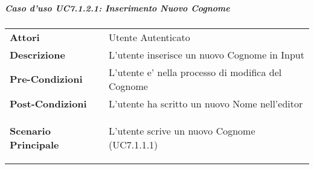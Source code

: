 \subparagraph{Caso d'uso UC7.1.2.1:  Inserimento Nuovo Cognome}
\label{UC7_1_2_1}

\begin{tabular}{ l | p{11cm}}
	\hline
	\rowcolor{Gray}
	 \multicolumn{2}{c}{UC7.1.2.1 - Inserimento Nuovo Cognome} \\
	 \hline
	\textbf{Attori} & Utente Autenticato \\
	\textbf{Descrizione} & L'utente inserisce un nuovo Cognome in Input\\
	\textbf{Pre-Condizioni} & L'utente e' nella processo di modifica del Cognome\\
	\textbf{Post-Condizioni} & L'utente ha scritto un nuovo Nome nell'editor\\
	\textbf{Scenario Principale} & 
	\begin{enumerate*}[label=(\arabic*.),itemjoin={\newline}]
		\item L'utente scrive un nuovo Cognome (UC7.1.1.1)
	\end{enumerate*}\\
\end{tabular}